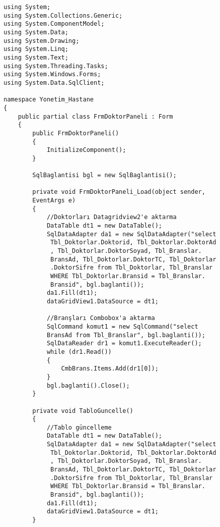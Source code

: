 \begin{lstlisting}
using System;
using System.Collections.Generic;
using System.ComponentModel;
using System.Data;
using System.Drawing;
using System.Linq;
using System.Text;
using System.Threading.Tasks;
using System.Windows.Forms;
using System.Data.SqlClient;

namespace Yonetim_Hastane
{
    public partial class FrmDoktorPaneli : Form
    {
        public FrmDoktorPaneli()
        {
            InitializeComponent();
        }

        SqlBaglantisi bgl = new SqlBaglantisi();

        private void FrmDoktorPaneli_Load(object sender, 
        EventArgs e)
        {
            //Doktorları Datagridview2'e aktarma
            DataTable dt1 = new DataTable();
            SqlDataAdapter da1 = new SqlDataAdapter("select
             Tbl_Doktorlar.Doktorid, Tbl_Doktorlar.DoktorAd
             , Tbl_Doktorlar.DoktorSoyad, Tbl_Branslar.
             BransAd, Tbl_Doktorlar.DoktorTC, Tbl_Doktorlar
             .DoktorSifre from Tbl_Doktorlar, Tbl_Branslar 
             WHERE Tbl_Doktorlar.Bransid = Tbl_Branslar.
             Bransid", bgl.baglanti());
            da1.Fill(dt1);
            dataGridView1.DataSource = dt1;

            //Branşları Combobox'a aktarma
            SqlCommand komut1 = new SqlCommand("select 
            BransAd from Tbl_Branslar", bgl.baglanti());
            SqlDataReader dr1 = komut1.ExecuteReader();
            while (dr1.Read())
            {
                CmbBrans.Items.Add(dr1[0]);
            }
            bgl.baglanti().Close();
        }

        private void TabloGuncelle()
        {
            //Tablo güncelleme
            DataTable dt1 = new DataTable();
            SqlDataAdapter da1 = new SqlDataAdapter("select
             Tbl_Doktorlar.Doktorid, Tbl_Doktorlar.DoktorAd
             , Tbl_Doktorlar.DoktorSoyad, Tbl_Branslar.
             BransAd, Tbl_Doktorlar.DoktorTC, Tbl_Doktorlar
             .DoktorSifre from Tbl_Doktorlar, Tbl_Branslar 
             WHERE Tbl_Doktorlar.Bransid = Tbl_Branslar.
             Bransid", bgl.baglanti());
            da1.Fill(dt1);
            dataGridView1.DataSource = dt1;
        }


\end{lstlisting}
